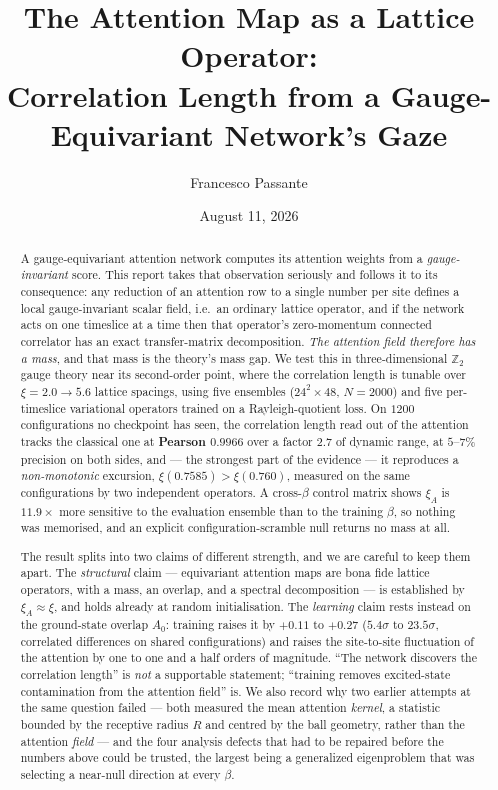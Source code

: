 \documentclass[11pt,a4paper]{article}
\title{The Attention Map as a Lattice Operator:\\
Correlation Length from a Gauge-Equivariant Network's Gaze}
\author{Francesco Passante}
\date{August 11, 2026}
\newcommand{\xiA}{\xi_A}
\begin{document}
\maketitle

\begin{abstract}
A gauge-equivariant attention network computes its attention weights from a
\emph{gauge-invariant} score. This report takes that observation seriously and
follows it to its consequence: any reduction of an attention row to a single
number per site defines a local gauge-invariant scalar field, i.e.\ an ordinary
lattice operator, and if the network acts on one timeslice at a time then that
operator's zero-momentum connected correlator has an exact transfer-matrix
decomposition. \emph{The attention field therefore has a mass}, and that mass is
the theory's mass gap. We test this in three-dimensional $\mathbb{Z}_2$ gauge
theory near its second-order point, where the correlation length is tunable over
$\xi = 2.0 \to 5.6$ lattice spacings, using five ensembles ($24^2\times48$,
$N=2000$) and five per-timeslice variational operators trained on a
Rayleigh-quotient loss. On $1200$ configurations no checkpoint has seen, the
correlation length read out of the attention tracks the classical one at
\textbf{Pearson $0.9966$} over a factor $2.7$ of dynamic range, at $5$--$7\%$
precision on both sides, and --- the strongest part of the evidence --- it
reproduces a \emph{non-monotonic} excursion, $\xi(0.7585) > \xi(0.760)$,
measured on the same configurations by two independent operators. A cross-$\beta$
control matrix shows $\xiA$ is $11.9\times$ more sensitive to the evaluation
ensemble than to the training $\beta$, so nothing was memorised, and an explicit
configuration-scramble null returns no mass at all.

The result splits into two claims of different strength, and we are careful to
keep them apart. The \emph{structural} claim --- equivariant attention maps are
bona fide lattice operators, with a mass, an overlap, and a spectral
decomposition --- is established by $\xiA \approx \xi$, and holds already at
random initialisation. The \emph{learning} claim rests instead on the
ground-state overlap $A_0$: training raises it by $+0.11$ to $+0.27$
($5.4\sigma$ to $23.5\sigma$, correlated differences on shared configurations)
and raises the site-to-site fluctuation of the attention by one to one and a
half orders of magnitude. ``The network discovers the correlation length'' is
\emph{not} a supportable statement; ``training removes excited-state
contamination from the attention field'' is. We also record why two earlier
attempts at the same question failed --- both measured the mean attention
\emph{kernel}, a statistic bounded by the receptive radius $R$ and centred by
the ball geometry, rather than the attention \emph{field} --- and the four
analysis defects that had to be repaired before the numbers above could be
trusted, the largest being a generalized eigenproblem that was selecting a
near-null direction at every $\beta$.
\end{abstract}
\end{document}
